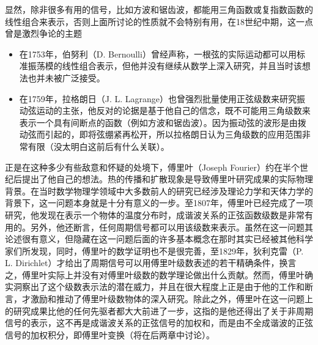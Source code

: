 显然，除非很多有用的信号，比如方波和锯齿波，都能用三角函数或复指数函数的线性组合来表示，否则上面所讨论的性质就不会特别有用，在18世纪中期，这一点曾是激烈争论的主题
\begin{itemize}
    \item 在1753年，伯努利（D. Bernoulli）曾经声称，一根弦的实际运动都可以用标准振荡模的线性组合表示，但他并没有继续从数学上深入研究，并且当时该想法也并未被广泛接受。
    \item 在1759年，拉格朗日（J. L. Lagrange）也曾强烈批量使用正弦级数来研究振动弦运动的主张，他反对的论据是基于他自己的信念，既不可能用三角级数来表示一个具有间断点的函数（例如方波和锯齿波）。因为振动弦的波形是由拨动弦而引起的，即将弦绷紧再松开，所以拉格朗日认为三角级数的应用范围非常有限（没太明白这前后有什么关联）。
\end{itemize}
正是在这种多少有些敌意和怀疑的处境下，傅里叶（Joseph Fourier）约在半个世纪后提出了他自己的想法。热的传播和扩散现象是导致傅里叶研究成果的实际物理背景。在当时数学物理学领域中大多数前人的研究已经涉及理论力学和天体力学的背景下，这一问题本身就是十分有意义的一步。至1807年，傅里叶已经完成了一项研究，他发现在表示一个物体的温度分布时，成谐波关系的正弦函数级数是非常有用的。另外，他还断言，任何周期信号都可以用该级数来表示。虽然在这一问题其论述很有意义，但隐藏在这一问题后面的许多基本概念在那时其实已经被其他科学家们所发现，同时，傅里叶的数学证明也不是很完善，至1829年，狄利克雷（P. L. Dirichlet）才给出了周期信号可以用傅里叶级数表述的若干精确条件，换言之，傅里叶实际上并没有对傅里叶级数的数学理论做出什么贡献。然而，傅里叶确实洞察出了这个级数表示法的潜在威力，并且在很大程度上正是由于他的工作和断言，才激励和推动了傅里叶级数物体的深入研究。除此之外，傅里叶在这一问题上的研究成果比他的任何先驱者都大大前进了一步，这指的是他还得出了关于非周期信号的表示，这不再是成谐波关系的正弦信号的加权和，而是由不全成谐波的正弦信号的加权积分，即傅里叶变换（将在后两章中讨论）。